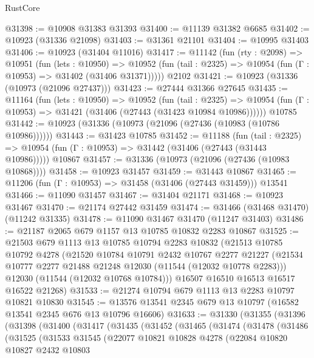\begin{lexlean}{RustCore}
\begin{coremodule}
@31398 := @10908 @31383 @31393
@31400 := @11139 @31382 @6685
@31402 := @10923 (@31336 @21098)
@31403 := @31361 @21101
@31404 := @10995 @31403
@31406 := @10923 (@31404 @11016)
@31417 := @11142
    (fun (rty : @2098) =>
    @10951
      (fun (lets : @10950) =>
      @10952 (fun (tail : @2325) => @10954 (fun (Γ : @10953) => @31402 (@31406 @31371)))))
    @2102
@31421 := @10923 (@31336 (@10973 (@21096 @27437)))
@31423 := @27444 @31366 @27645
@31435 := @11164
    (fun (lets : @10950) =>
    @10952
      (fun (tail : @2325) =>
      @10954 (fun (Γ : @10953) => @31421 (@31406 (@27443 (@31423 @10984 @10986))))))
    @10785
@31442 := @10923 (@31336 (@10973 (@21096 (@27436 (@10983 (@10786 @10986))))))
@31443 := @31423 @10785
@31452 := @11188
    (fun (tail : @2325) => @10954 (fun (Γ : @10953) => @31442 (@31406 (@27443 (@31443 @10986)))))
    @10867
@31457 := @31336 (@10973 (@21096 (@27436 (@10983 @10868))))
@31458 := @10923 @31457
@31459 := @31443 @10867
@31465 := @11206 (fun (Γ : @10953) => @31458 (@31406 (@27443 @31459))) @13541
@31466 := @11090 @31457
@31467 := @31404 @21171
@31468 := @10923 @31467
@31470 := @21174 @27442 @31459
@31474 := @31466 (@31468 @31470) (@11242 @31335)
@31478 := @11090 @31467 @31470 (@11247 @31403)
@31486 := @21187 @2065 @679 @1157 @13 @10785 @10832 @2283 @10867
@31525 := @21503
    @679
    @1113
    @13
    @10785
    @10794
    @2283
    @10832
    (@21513
      @10785
      @10792
      @4278
      (@21520
        @10784
        @10791
        @2432
        @10767
        @2277
        @21227
        (@21534 @10777 @2277 @21488 @21248 @12030 (@11544 (@12032 @10778 @2283)))
        @12030
        (@11544 (@12032 @10768 @10784)))
      @16507
      @16510
      @16513
      @16517
      @16522
      @21268)
@31533 := @21274 @10794 @679 @1113 @13 @2283 @10797 @10821 @10830
@31545 := @13576 @13541 @2345 @679 @13 @10797 (@16582 @13541 @2345 @676 @13 @10796 @16606)
@31633 := @31330
    (@31355
      (@31396
        (@31398
          (@31400
            (@31417
              (@31435
                (@31452
                  (@31465
                    (@31474
                      (@31478
                        (@31486
                          (@31525
                            (@31533
                              @31545
                              (@22077
                                @10821
                                @10828
                                @4278
                                (@22084
                                  @10820
                                  @10827
                                  @2432
                                  @10803

\end{coremodule}
\end{lexlean}
